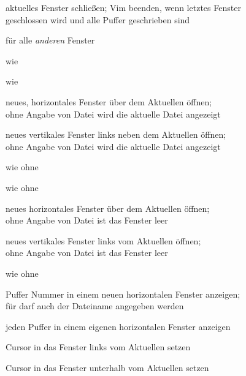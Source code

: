 \documentclass
[
  draft    = true,
  fontsize = 11pt,
  parskip  = half,
  BCOR     = 0pt,
  DIV      = calc,
  ngerman
]
{scrartcl}
\begin{document}
\begin{mytemize}
  \renewcommand{\cmdwidth}{6em}%
  \item {}       aktuelles Fenster schließen; Vim beenden, wenn letztes Fenster\\
        \vimcmd{}{}{}            geschlossen wird und alle Puffer geschrieben sind
  \item {}        für alle \emph{anderen} Fenster
  \item {}     wie 
  \item {}     wie 
  \item {}     neues, horizontales Fenster über dem Aktuellen öffnen;\\
        \vimcmd{}{}{}            ohne Angabe von Datei  wird die aktuelle Datei angezeigt
  \item {}    neues vertikales Fenster links neben dem Aktuellen öffnen;\\
        \vimcmd{}{}{}            ohne Angabe von Datei  wird die aktuelle Datei angezeigt
  \item {}     wie  ohne 
  \item {}     wie  ohne 
  \item {}       neues horizontales Fenster über dem Aktuellen öffnen;\\
        \vimcmd{}{}{}            ohne Angabe von Datei  ist das Fenster leer
  \item {}      neues vertikales Fenster links vom Aktuellen öffnen;\\
        \vimcmd{}{}{}            ohne Angabe von Datei  ist das Fenster leer
  \item {}     wie  ohne 
  \item {}        Puffer Nummer  in einem neuen horizontalen Fenster anzeigen;\\
        \vimcmd{}{}{}            für  darf auch der Dateiname angegeben werden
  \item {}      jeden Puffer in einem eigenen horizontalen Fenster anzeigen
  \item {}       Cursor in das Fenster links vom Aktuellen setzen
  \item {}       Cursor in das Fenster unterhalb vom Aktuellen setzen

\end{mytemize}
\end{document}

